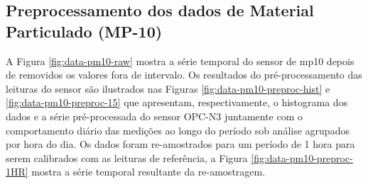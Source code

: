 \subsection{Preprocessamento dos dados de Material Particulado (MP-10)}

A Figura \ref{fig:data-pm10-raw} mostra a série temporal do sensor de \acrshort{mp10} depois de removidos os valores fora de intervalo. Os resultados do pré-processamento das leituras do sensor são ilustrados nas Figuras \ref{fig:data-pm10-preproc-hist} e \ref{fig:data-pm10-preproc-15} que apresentam, respectivamente, o histograma dos dados e a série pré-processada do sensor OPC-N3 juntamente com o comportamento diário das medições ao longo do período sob análise agrupados por hora do dia. Os dados foram re-amostrados para um período de 1 hora para serem calibrados com as leituras de referência, a Figura \ref{fig:data-pm10-preproc-1HR} mostra a série temporal resultante da re-amostragem.

